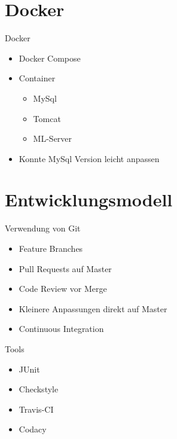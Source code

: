 \documentclass[xcolor=dvipsnames]{beamer}
\begin{document}
\section{Docker}
\begin{frame}{Docker}
\begin{itemize}
    \item Docker Compose
    \item Container
    \begin{itemize}
        \item MySql
        \item Tomcat
        \item ML-Server
    \end{itemize}
    \item Konnte MySql Version leicht anpassen
\end{itemize}
\end{frame}

\section{Entwicklungsmodell}
\begin{frame}{Verwendung von Git}
    \begin{itemize}
        \item Feature Branches
        \item Pull Requests auf Master
        \item Code Review vor Merge
        \item Kleinere Anpassungen direkt auf Master
        \item Continuous Integration
    \end{itemize}
\end{frame}

\begin{frame}{Tools}
    \begin{itemize}
        \item JUnit
        \item Checkstyle
        \item Travis-CI
        \item Codacy
    \end{itemize}
\end{frame}
\end{document}
